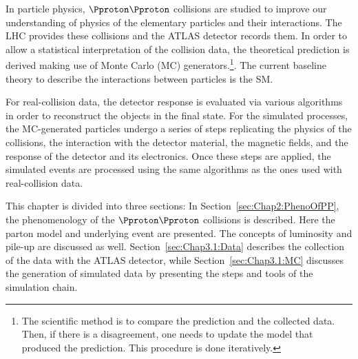 In particle physics, $\Pproton \Pproton$ collisions are studied to improve our understanding 
of physics of the elementary particles and their interactions. The LHC provides these collisions 
and the ATLAS detector records them. 
In order to allow a statistical interpretation of the collision data, the theoretical prediction is 
derived making use of Monte Carlo (MC) generators.\footnote{The scientific method is to compare the prediction 
and the collected data. Then, if there is a disagreement, one needs to update the model that produced the prediction. 
This procedure is done iteratively.}.  The current baseline theory to describe
the interactions between particles is the SM.




For real-collision data, the detector response is evaluated via various algorithms
in order to reconstruct the objects in the final state.
For the simulated processes,
the MC-generated particles undergo a series of steps replicating the physics of
the collisions, the interaction with the detector material, the magnetic fields, and
the response of the detector and its electronics. Once these steps are applied,
the simulated events are processed using the same algorithms as the ones 
used with real-collision data. 


 This chapter is divided into three sections: In Section~\ref{sec:Chap2:PhenoOfPP}, the phenomenology of 
 the $\Pproton \Pproton$ collisions is described. Here the parton model and underlying
 event are presented. The concepts of luminosity and pile-up are discussed as well.
Section~\ref{sec:Chap3.1:Data} describes the collection of the 
 data with the ATLAS detector, while Section~\ref{sec:Chap3.1:MC}
 discusses the generation of simulated data by presenting the steps and tools
 of the simulation chain.


